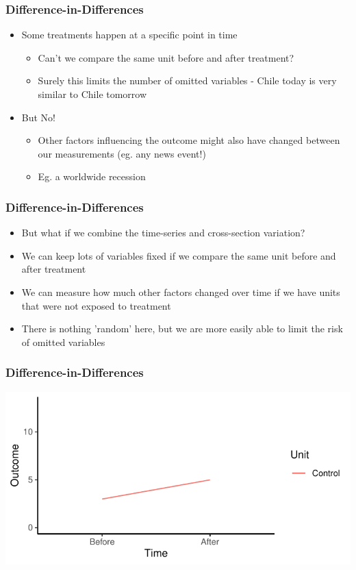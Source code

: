 \documentclass[xcolor=x11names,compress]{beamer}\usepackage[]{graphicx}\usepackage[]{xcolor}
\makeatletter
\def\maxwidth{ %
  \ifdim\Gin@nat@width>\linewidth
    \linewidth
  \else
    \Gin@nat@width
  \fi
}
\newenvironment{knitrout}{}{} %
\renewcommand{\(}{\begin{columns}}
\renewcommand{\)}{\end{columns}}
\newcommand{\<}[1]{\begin{column}{#1}}
\renewcommand{\>}{\end{column}}
\makeatother
\begin{document}
\begin{frame}
\frametitle{Difference-in-Differences}
\begin{itemize}
\item Some treatments happen at a specific point in time
\begin{itemize}
\item Can't we compare the same unit before and after treatment?
\pause
\item Surely this limits the number of omitted variables - Chile today is very similar to Chile tomorrow
\end{itemize}
\item But No!
\begin{itemize}
\item Other factors influencing the outcome might also have changed between our measurements (eg. any news event!)
\item Eg. a worldwide recession
\end{itemize}
\end{itemize}
\end{frame}

\begin{frame}
\frametitle{Difference-in-Differences}
\begin{itemize}
\item But what if we combine the time-series and cross-section variation?
\pause
\item We can keep lots of variables fixed if we compare the same unit before and after treatment
\pause
\item We can measure how much other factors changed over time if we have units that were not exposed to treatment
\pause
\item There is nothing 'random' here, but we are more easily able to limit the risk of omitted variables
\end{itemize}
\end{frame}

\begin{frame}
\frametitle{Difference-in-Differences}
\begin{knitrout}
\color{fgcolor}
\includegraphics[width=\maxwidth]{figure/DinD_chart1-1} 
\end{knitrout}
\end{frame}
\end{document}
